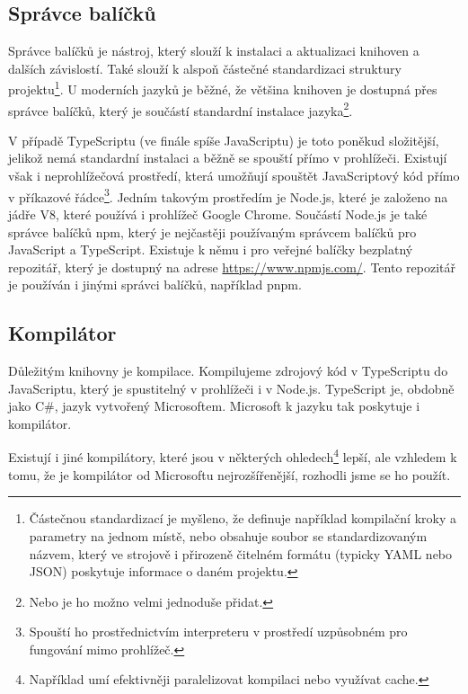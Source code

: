 \subsection{Správce balíčků}
\label{subsec:package-manager}

Správce balíčků je nástroj, který slouží k instalaci a aktualizaci knihoven a dalších závislostí.
Také slouží k alspoň částečné standardizaci struktury projektu\footnote{Částečnou standardizací je myšleno, že definuje například kompilační kroky a parametry na jednom místě, nebo obsahuje soubor se standardizovaným názvem, který ve strojově i přirozeně čitelném formátu (typicky YAML nebo JSON) poskytuje informace o daném projektu.}. 
U moderních jazyků je běžné, že většina knihoven je dostupná přes správce balíčků, který je součástí standardní instalace jazyka\footnote{Nebo je ho možno velmi jednoduše přidat.}\cite{npm:docs,Rust:cargo,golang:pkg,python:pip}.

V případě TypeScriptu (ve finále spíše JavaScriptu) je toto poněkud složitější, jelikož nemá standardní instalaci a běžně se spouští přímo v prohlížeči.
Existují však i neprohlížečová prostředí, která umožňují spouštět JavaScriptový kód přímo v příkazové řádce\footnote{Spouští ho prostřednictvím interpreteru v prostředí uzpůsobném pro fungování mimo prohlížeč.}. 
Jedním takovým prostředím je Node.js, které je založeno na jádře V8\cite{node:v8}, které používá i prohlížeč Google Chrome\cite{v8}.
Součástí Node.js je také správce balíčků npm\cite{npm:docs}, který je nejčastěji používaným správcem balíčků pro JavaScript a TypeScript. 
Existuje k němu i pro veřejné balíčky bezplatný repozitář, který je dostupný na adrese \url{https://www.npmjs.com/}.
Tento repozitář je používán i jinými správci balíčků, například pnpm\cite{pnpm}.

\subsection{Kompilátor}
\label{subsec:compiler}

Důležitým  knihovny je kompilace. 
Kompilujeme zdrojový kód v TypeScriptu do JavaScriptu, který je spustitelný v prohlížeči i v Node.js. 
TypeScript je, obdobně jako C\#, jazyk vytvořený Microsoftem\cite{TypeScript}.
Microsoft k jazyku tak poskytuje i kompilátor.

Existují i jiné kompilátory, které jsou v některých ohledech\footnote{Například umí efektivněji paralelizovat kompilaci nebo využívat cache.} lepší, ale vzhledem k tomu, že je kompilátor od Microsoftu nejrozšířenější, rozhodli jsme se ho použít.

